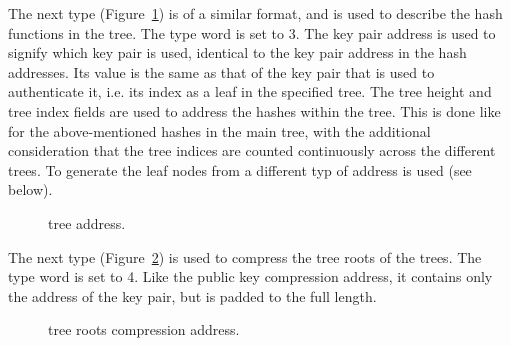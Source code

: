    The next type (Figure~\ref{fig:adrs:forstree}) is of a similar format, and is used to describe the hash functions
   in the \fors tree.  The type word is set to 3.  The key pair address is used to signify which \fors key pair is used,
   identical to the key pair address in the \wotsp hash addresses.
   Its value is the same as that of the \wotsp key pair that is used to authenticate it,
   i.e. its index as a leaf in the specified tree.
   The tree height and tree index fields are used to address the hashes within the \fors tree.
   This is done like for the above-mentioned hashes in the main tree,
   with the additional consideration that the tree indices are counted
   continuously across the different \fors trees.
   To generate the leaf nodes from \sseed a different typ of address is used (see below).

\begin{figure}[h]
  \centering
  \caption{\fors tree address.}
  \label{fig:adrs:forstree}
\end{figure}


   The next type (Figure~\ref{fig:adrs:forspk}) is used to compress the tree roots of the \fors trees.  The type word is set to 4.
   Like the \wotsp public key compression address, it contains only the address
   of the \fors key pair, but is padded to the full length.

\begin{figure}[h]
  \centering
  \caption{\fors tree roots compression address.}
  \label{fig:adrs:forspk}
\end{figure}


